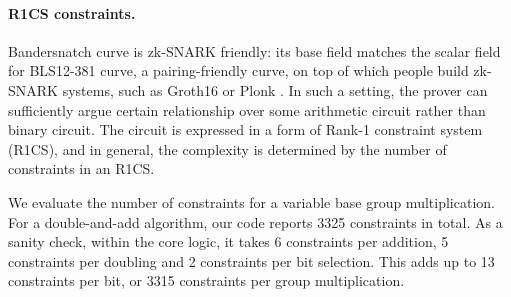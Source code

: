 \documentclass{article}
\newcommand{\ZZ}[1]{\color{cyan}#1\color{black}}
\theoremstyle{definition}
\begin{document}
\paragraph{R1CS constraints.}
Bandersnatch curve is zk-SNARK friendly: its 
base field matches the scalar field for BLS12-381 curve, a 
pairing-friendly curve, on top of which people build zk-SNARK
systems, such as Groth16 \cite{EC:Groth16} or Plonk \cite{EPRINT:GabWilCio19}.
In such a setting, the prover can sufficiently argue certain 
relationship over some arithmetic circuit rather than binary
circuit.
The circuit is expressed in a form of Rank-1 constraint system
(R1CS), and in general, the complexity is determined by the 
number of constraints in an R1CS. 

We evaluate the number of constraints for a 
variable base group multiplication. For a double-and-add
algorithm, 
our code reports 3325 constraints in 
total.
As a sanity check, within the core logic,
it takes 6 constraints per addition, 5 constraints
per doubling and 2 constraints per bit selection. This adds
up to 13 constraints per bit, or 3315 constraints per
group multiplication. 



  
\end{document}
